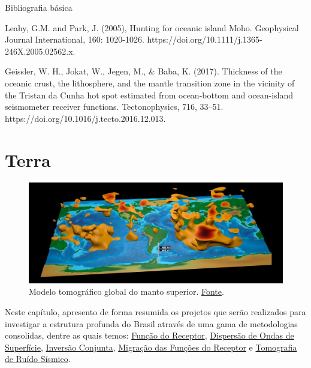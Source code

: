 \documentclass[10pt,a4paper,oneside]{book}
\newcommand{\HeroFigPad}{\vspace{-1cm}}
\begin{document}
\begin{fancyenum}{\faBook}{Bibliografia básica}
	\item Leahy, G.M. and Park, J. (2005), Hunting for oceanic island Moho. Geophysical Journal International, 160: 1020-1026. https://doi.org/10.1111/j.1365-246X.2005.02562.x.
	\item Geissler, W. H., Jokat, W., Jegen, M., \& Baba, K. (2017). Thickness of the oceanic crust, the lithosphere, and the mantle transition zone in the vicinity of the Tristan da Cunha hot spot estimated from ocean-bottom and ocean-island seismometer receiver functions. Tectonophysics, 716, 33–51. https://doi.org/10.1016/j.tecto.2016.12.013.
\end{fancyenum}

\chapter{Terra}
\label{cap_terra}

\begin{figure}[h]
	\HeroFigPad
	\begin{center}
		\includegraphics[width=\textwidth]{images/globe_structure.jpg}
	\end{center}
	\caption{
	Modelo tomográfico global do manto superior. \href{https://www.olcf.ornl.gov/2017/03/28/a-seismic-mapping-milestone/}{Fonte}.
    }
 \label{fig_structure}
\end{figure}

Neste capítulo, apresento de forma resumida os projetos que serão realizados para investigar a estrutura profunda do Brasil através de uma gama de metodologias consolidas, dentre as quais temos: \href{https://doi.org/10.1029/JB084iB09p04749}{Função do Receptor}, \href{https://doi.org/10.1111/j.1365-246X.1990.tb04573.x}{Dispersão de Ondas de Superfície}, \href{https://doi.org/10.1046/j.1365-246x.2000.00217.x}{Inversão Conjunta}, \href{https://doi.org/10.1016/j.epsl.2013.08.025}{Migração das Funções do Receptor} e \href{https://doi.org/10.1111/j.1365-246X.2007.03374.x}{Tomografia de Ruído Sísmico}.   
\end{document}
